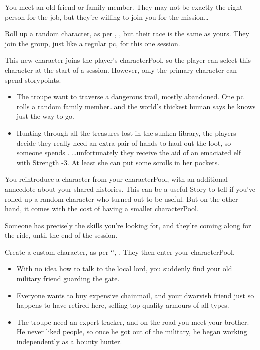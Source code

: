 \begin{multicols}{2}
\label{oldFriend}
You meet an old friend or family member.
They may not be exactly the right person for the job, but they're willing to join you for the mission\ldots

Roll up a random character, as per , , but their race is the same as yours.
They join the group, just like a regular \gls{pc}, for this one session.

This new character joins the player's \gls{characterPool}, so the player can select this character at the start of a session.
However, only the primary character can spend \glspl{storypoint}.

\begin{itemize}
  \item
  The troupe want to traverse a dangerous trail, mostly abandoned.
  One \gls{pc} rolls a random family member\ldots and the world's thickest human says he knows just the way to go.
  \item
  Hunting through all the treasures lost in the sunken library, the players decide they really need an extra pair of hands to haul out the loot, so someone spends .
  \ldots unfortunately they receive the aid of an emaciated elf with Strength -3.
  At least she can put some scrolls in her pockets.
\end{itemize}

\label{returnFriend}
You reintroduce a character from your \gls{characterPool}, with an additional annecdote about your shared histories.
This can be a useful Story to tell if you've rolled up a random character who turned out to be useful.
But on the other hand, it comes with the cost of having a smaller \gls{characterPool}.

Someone has precisely the skills you're looking for, and they're coming along for the ride, until the end of the session.

Create a custom character, as per `', .
They then enter your \gls{characterPool}.

\begin{itemize}
  \item
  With no idea how to talk to the local lord, you suddenly find your old military friend guarding the gate.
  \item
  Everyone wants to buy expensive chainmail, and your dwarvish friend just so happens to have retired here, selling top-quality armours of all types.
  \item
  The troupe need an expert tracker, and on the road you meet your brother.
  He never liked people, so once he got out of the military, he began working independently as a bounty hunter.
\end{itemize}


\end{multicols}
